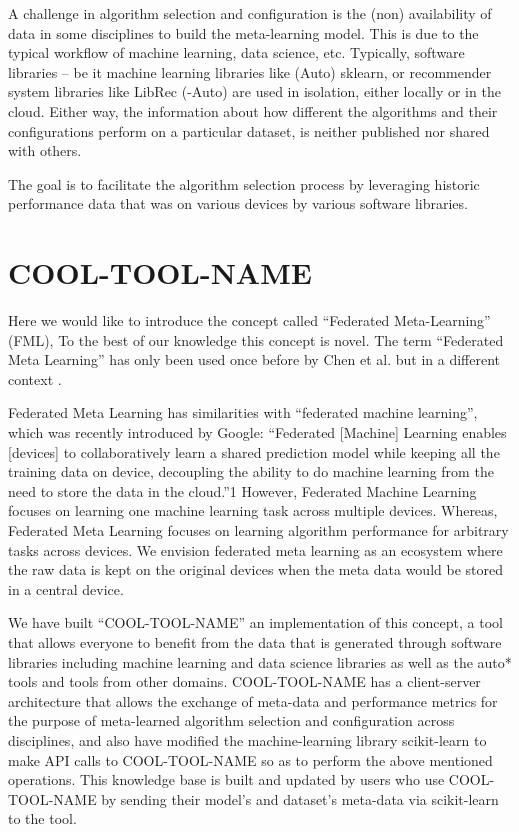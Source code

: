 \documentclass{article}
\begin{document}
A challenge in algorithm selection and configuration is the (non) availability of data in some disciplines to build the meta-learning model. This is due to the typical workflow of machine learning, data science, etc. Typically, software libraries – be it machine learning libraries like (Auto) sklearn, or recommender system libraries like LibRec (-Auto) are used in isolation, either locally or in the cloud. Either way, the information about how different the algorithms and their configurations perform on a particular dataset, is neither published nor shared with others.

The goal is to facilitate the algorithm selection process by leveraging historic performance data that was on various devices by various software libraries.


\section{COOL-TOOL-NAME}
Here we would like to introduce the concept called “Federated Meta-Learning” (FML), To the best of our knowledge this concept is novel. The term “Federated Meta Learning” has only been used once before by Chen et al. but in a different context \cite{chen-et-al}. 

Federated Meta Learning has similarities with “federated machine learning”, which was recently introduced by Google: “Federated [Machine] Learning enables [devices] to collaboratively learn a shared prediction model while keeping all the training data on device, decoupling the ability to do machine learning from the need to store the data in the cloud.”1 However, Federated Machine Learning focuses on learning one machine learning task across multiple devices. Whereas, Federated Meta Learning focuses on learning algorithm performance for arbitrary tasks across devices. We envision federated meta learning as an ecosystem where the raw data is kept on the original devices when the meta data would be stored in a central device. 

We have built “COOL-TOOL-NAME” an implementation of this concept, a tool that allows everyone to benefit from the data that is generated through software libraries including machine learning and data science libraries as well as the auto* tools and tools from other domains. COOL-TOOL-NAME has a client-server architecture that allows the exchange of meta-data and performance metrics for the purpose of meta-learned algorithm selection and configuration across disciplines, and also have modified the machine-learning library scikit-learn to make API calls to COOL-TOOL-NAME so as to perform the above mentioned operations. This knowledge base is built and updated by users who use COOL-TOOL-NAME by sending their model’s and dataset’s meta-data via scikit-learn to the tool.
\end{document}
